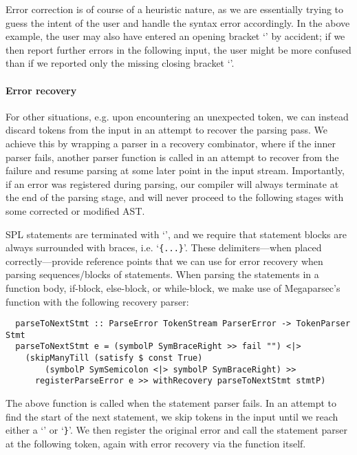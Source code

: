 Error correction is of course of a heuristic nature, as we are essentially
trying to guess the intent of the user and handle the syntax error accordingly.
In the above example, the user may also have entered an opening bracket
`\code{[}' by accident; if we then report further errors in the following input,
the user might be more confused than if we reported only the missing closing
bracket `\code{]}'.


\paragraph{Error recovery}

For other situations, e.g. upon encountering an unexpected token, we can instead
discard tokens from the input in an attempt to recover the parsing pass.
We achieve this by wrapping a parser in a recovery combinator, where if the
inner parser fails, another parser function is called in an attempt to recover
from the failure and resume parsing at some later point in the input stream.
Importantly, if an error was registered during parsing, our compiler will always
terminate at the end of the parsing stage, and will never proceed to the
following stages with some corrected or modified AST.

SPL statements are terminated with `\code{;}', and we require that
statement blocks are always surrounded with braces, i.e. `\verb|{...}|'.
These delimiters---when placed correctly---provide reference points that we can
use for error recovery when parsing sequences/blocks of statements.
When parsing the statements in a function body, if-block, else-block, or
while-block, we make use of Megaparsec's  function with the
following recovery parser:
\begin{verbatim}
  parseToNextStmt :: ParseError TokenStream ParserError -> TokenParser Stmt
  parseToNextStmt e = (symbolP SymBraceRight >> fail "") <|>
    (skipManyTill (satisfy $ const True)
        (symbolP SymSemicolon <|> symbolP SymBraceRight) >>
      registerParseError e >> withRecovery parseToNextStmt stmtP)
\end{verbatim}

The above function is called when the statement parser  fails.
In an attempt to find the start of the next statement, we skip tokens in the
input until we reach either a `\code{;}' or `\verb|}|'.
We then register the original error and call the statement parser at the
following token, again with error recovery via the 
function itself.

